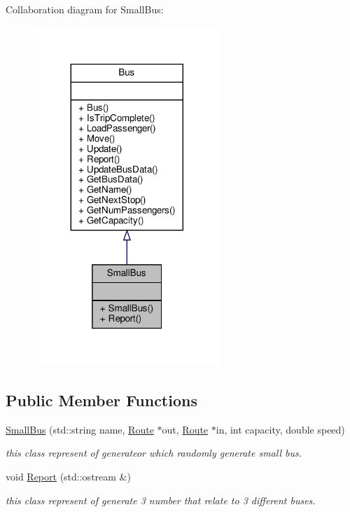 Collaboration diagram for Small\+Bus\+:
\nopagebreak
\begin{figure}[H]
\begin{center}
\leavevmode
\includegraphics[width=200pt]{classSmallBus__coll__graph}
\end{center}
\end{figure}
\subsection*{Public Member Functions}
\begin{DoxyCompactItemize}
\item 
\hyperlink{classSmallBus_ab92bbfb8a88c33ffeabc685a6857820c}{Small\+Bus} (std\+::string name, \hyperlink{classRoute}{Route} $\ast$out, \hyperlink{classRoute}{Route} $\ast$in, int capacity, double speed)
\begin{DoxyCompactList}\small\item\em this class represent of generateor which randomly generate small bus. \end{DoxyCompactList}\item 
void \hyperlink{classSmallBus_a989198babc9a180799de58b4f3dadb50}{Report} (std\+::ostream \&)
\begin{DoxyCompactList}\small\item\em this class represent of generate 3 number that relate to 3 different buses. \end{DoxyCompactList}\end{DoxyCompactItemize}


